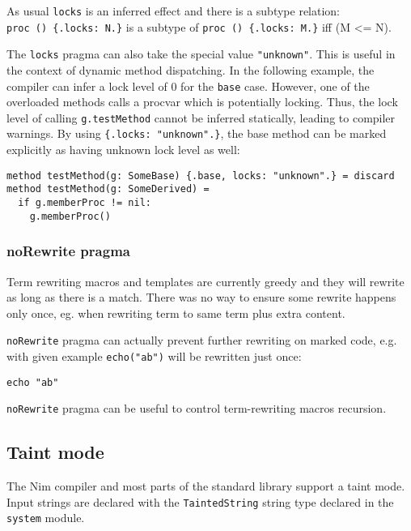 As usual \texttt{locks} is an inferred effect and there is a subtype
relation: \texttt{proc\ ()\ \{.locks:\ N.\}} is a subtype of
\texttt{proc\ ()\ \{.locks:\ M.\}} iff (M \textless= N).

The \texttt{locks} pragma can also take the special value
\texttt{"unknown"}. This is useful in the context of dynamic method
dispatching. In the following example, the compiler can infer a lock
level of 0 for the \texttt{base} case. However, one of the overloaded
methods calls a procvar which is potentially locking. Thus, the lock
level of calling \texttt{g.testMethod} cannot be inferred statically,
leading to compiler warnings. By using \texttt{\{.locks:\ "unknown".\}},
the base method can be marked explicitly as having unknown lock level as
well:

\begin{verbatim}
method testMethod(g: SomeBase) {.base, locks: "unknown".} = discard
method testMethod(g: SomeDerived) =
  if g.memberProc != nil:
    g.memberProc()
\end{verbatim}

\hypertarget{norewrite-pragma}{%
\subsubsection{noRewrite pragma}\label{norewrite-pragma}}

Term rewriting macros and templates are currently greedy and they will
rewrite as long as there is a match. There was no way to ensure some
rewrite happens only once, eg. when rewriting term to same term plus
extra content.

\texttt{noRewrite} pragma can actually prevent further rewriting on
marked code, e.g. with given example \texttt{echo("ab")} will be
rewritten just once:

\begin{verbatim}
echo "ab"
\end{verbatim}

\texttt{noRewrite} pragma can be useful to control term-rewriting macros
recursion.

\hypertarget{taint-mode}{%
\subsection{Taint mode}\label{taint-mode}}

The Nim compiler and most parts of the standard library support a taint
mode. Input strings are declared with the \texttt{TaintedString} string
type declared in the \texttt{system} module.

